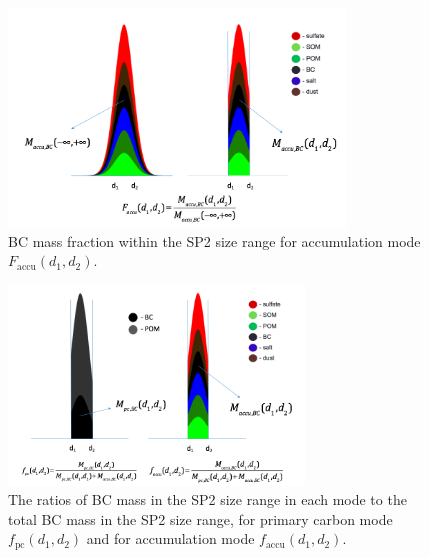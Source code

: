 \documentclass[12pt, fullpage]{uiucthesis2009_2}
\begin{document}
	\begin{figure}[h] 
		\begin{center}
			\includegraphics[width = 0.8\textwidth]{Rplot06}
			\caption[BC mass fraction within the SP2 size range for accumulation mode $F_{\text{accu}}(d_{1}, d_{2})$]{\label{fig_R2} BC mass fraction within the SP2 size range for accumulation mode $F_{\text{accu}}(d_{1}, d_{2})$.}
		\end{center}
	\end{figure}
	
	\begin{figure}[h] 
		\begin{center}
			\includegraphics[width = 0.7\textwidth]{Rplot07}
			\caption[The ratios of BC mass in the SP2 size range in each mode to the total BC mass in the SP2 size range, for primary carbon mode $f_{\text{pc}}(d_{1}, d_{2})$ and for accumulation mode $f_{\text{accu}}(d_{1}, d_{2})$]{\label{fig_R3} The ratios of BC mass in the SP2 size range in each mode to the total BC mass in the SP2 size range, for primary carbon mode $f_{\text{pc}}(d_{1}, d_{2})$ and for accumulation mode $f_{\text{accu}}(d_{1}, d_{2})$.}
		\end{center}
	\end{figure}
	
\end{document}
